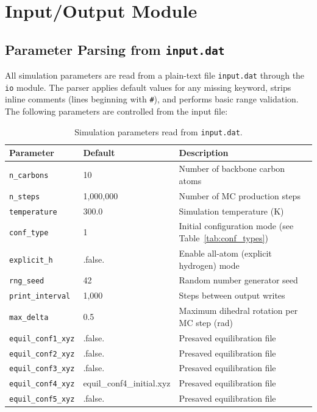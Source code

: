 
\section{Input/Output Module}
\label{sec:io}

\subsection{Parameter Parsing from \texttt{input.dat}}

All simulation parameters are read from a plain-text file \texttt{input.dat}
through the \texttt{io} module. The parser applies default values for any
missing keyword, strips inline comments (lines beginning with \texttt{\#}),
and performs basic range validation. The following parameters are controlled
from the input file:

\begin{table}[ht]
\centering
\caption{Simulation parameters read from \texttt{input.dat}.}
\label{tab:input_params}
\begin{tabular}{lll}
\toprule
Parameter & Default & Description \\
\midrule
\texttt{n\_carbons}   & 10       & Number of backbone carbon atoms \\
\texttt{n\_steps}     & 1{,}000{,}000 & Number of MC production steps \\
\texttt{temperature}  & 300.0    & Simulation temperature (K) \\
\texttt{conf\_type}   & 1        & Initial configuration mode (see Table~\ref{tab:conf_types}) \\
\texttt{explicit\_h}  & .false.  & Enable all-atom (explicit hydrogen) mode \\
\texttt{rng\_seed}    & 42       & Random number generator seed \\
\texttt{print\_interval} & 1{,}000 & Steps between output writes \\
\texttt{max\_delta}   & 0.5      & Maximum dihedral rotation per MC step (rad) \\
\texttt{equil\_conf1\_xyz}   & .false.  & Presaved equilibration file \\
\texttt{equil\_conf2\_xyz}   & .false.  & Presaved equilibration file \\
\texttt{equil\_conf3\_xyz}   & .false.  & Presaved equilibration file \\
\texttt{equil\_conf4\_xyz}   & equil\_conf4\_initial.xyz  & Presaved equilibration file \\
\texttt{equil\_conf5\_xyz}   & .false.  & Presaved equilibration file \\
\midrule
\end{tabular}
\end{table}

